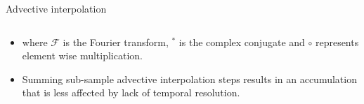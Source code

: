 \documentclass[final]{beamer}
\begin{document}
\begin{frame}{}
\begin{columns}[t]
\begin{column}{.3\linewidth}
\begin{block}{Advective interpolation}
\begin{columns}[t]
	\end{columns}
	      \begin{itemize}
	      \item where $\mathcal{F}$ is the Fourier transform, $^*$ is the complex conjugate and $\circ$ represents element wise multiplication. 
	      \item Summing sub-sample advective interpolation steps results in an accumulation that is less affected by lack of temporal resolution.
	    \end{itemize}


\end{block}
\end{column}
\end{columns}
\end{frame}
\end{document}
